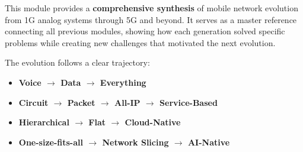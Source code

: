 
This module provides a \textbf{comprehensive synthesis} of mobile network evolution from 1G analog systems through 5G and beyond. It serves as a master reference connecting all previous modules, showing how each generation solved specific problems while creating new challenges that motivated the next evolution.

The evolution follows a clear trajectory:

\begin{itemize}
\tightlist
\item
  \textbf{Voice \ensuremath{\to} Data \ensuremath{\to} Everything}
\item
  \textbf{Circuit \ensuremath{\to} Packet \ensuremath{\to} All-IP \ensuremath{\to} Service-Based}
\item
  \textbf{Hierarchical \ensuremath{\to} Flat \ensuremath{\to} Cloud-Native}
\item
  \textbf{One-size-fits-all \ensuremath{\to} Network Slicing \ensuremath{\to} AI-Native}
\end{itemize}



